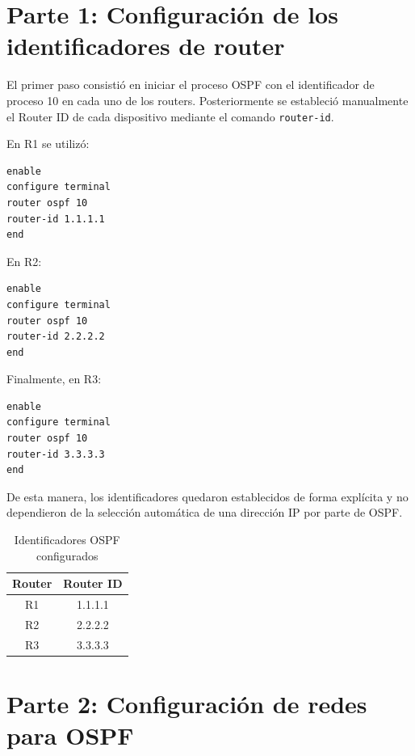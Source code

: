 \documentclass[12pt,a4paper]{article}
\begin{document}
\section{Parte 1: Configuración de los identificadores de router}

El primer paso consistió en iniciar el proceso OSPF con el identificador
de proceso 10 en cada uno de los routers. Posteriormente se estableció
manualmente el Router ID de cada dispositivo mediante el comando
\texttt{router-id}.

En R1 se utilizó:

\begin{lstlisting}[style=cisco]
enable
configure terminal
router ospf 10
router-id 1.1.1.1
end
\end{lstlisting}

En R2:

\begin{lstlisting}[style=cisco]
enable
configure terminal
router ospf 10
router-id 2.2.2.2
end
\end{lstlisting}

Finalmente, en R3:

\begin{lstlisting}[style=cisco]
enable
configure terminal
router ospf 10
router-id 3.3.3.3
end
\end{lstlisting}

De esta manera, los identificadores quedaron establecidos de forma
explícita y no dependieron de la selección automática de una dirección
IP por parte de OSPF.

\begin{table}[H]
\centering
\caption{Identificadores OSPF configurados}
\begin{tabular}{cc}
\toprule
\textbf{Router} & \textbf{Router ID} \\
\midrule
R1 & 1.1.1.1 \\
R2 & 2.2.2.2 \\
R3 & 3.3.3.3 \\
\bottomrule
\end{tabular}
\end{table}

\section{Parte 2: Configuración de redes para OSPF}
\end{document}

